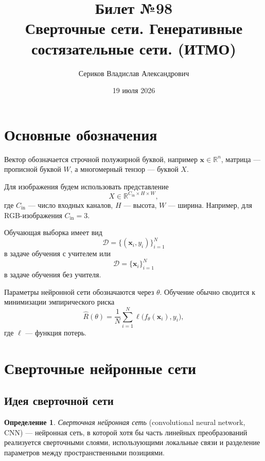 \documentclass[12pt,a4paper]{article}
\title{Билет №98 \\ \small Сверточные сети. Генеративные состязательные сети. (ИТМО)}
\author{Сериков Владислав Александрович}
\date{19 июля 2026}
\newcommand{\R}{\mathbb{R}}
\numberwithin{equation}{section}
\theoremstyle{definition}
\newtheorem{definition}[theorem]{Определение}
\theoremstyle{remark}
\begin{document}
\maketitle
\tableofcontents
\newpage

\section{Основные обозначения}

Вектор обозначается строчной полужирной буквой, например
\(\bm{x}\in\R^n\), матрица --- прописной буквой \(W\), а многомерный
тензор --- буквой \(X\).

Для изображения будем использовать представление
\[
    X\in\R^{C_{\mathrm{in}}\times H\times W},
\]
где \(C_{\mathrm{in}}\) --- число входных каналов, \(H\) --- высота,
\(W\) --- ширина. Например, для RGB-изображения
\(C_{\mathrm{in}}=3\).

Обучающая выборка имеет вид
\[
    \mathcal{D}=\{(\bm{x}_i,y_i)\}_{i=1}^{N}
\]
в задаче обучения с учителем или
\[
    \mathcal{D}=\{\bm{x}_i\}_{i=1}^{N}
\]
в задаче обучения без учителя.

Параметры нейронной сети обозначаются через \(\theta\). Обучение обычно
сводится к минимизации эмпирического риска
\[
    \widehat{R}(\theta)
    =
    \frac{1}{N}\sum_{i=1}^{N}
    \ell\bigl(f_\theta(\bm{x}_i),y_i\bigr),
\]
где \(\ell\) --- функция потерь.

\section{Сверточные нейронные сети}

\subsection{Идея сверточной сети}

\begin{definition}
\emph{Сверточная нейронная сеть} (convolutional neural network, CNN) ---
нейронная сеть, в которой хотя бы часть линейных преобразований
реализуется сверточными слоями, использующими локальные связи и
разделение параметров между пространственными позициями.
\end{definition}
\end{document}
